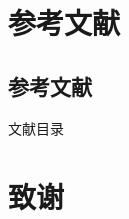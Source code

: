 \documentclass[hyperref,UTF8,11pt,CJK,handout]{beamer}
\begin{document}
%			
%			

\section{参考文献}
\subsection{参考文献}
\begin{frame}[allowframebreaks]{文献目录}
	\nocite{*}
	\printbibliography[heading=none]
\end{frame}

\section{致谢}
\end{document}
